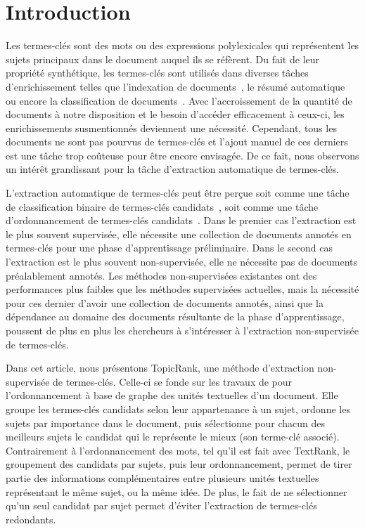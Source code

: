\section{Introduction}
\label{sec:introduction}
  Les termes-clés sont des mots ou des expressions polylexicales qui
  représentent les sujets principaux dans le document auquel ils se réfèrent.
  Du fait de leur propriété synthétique, les termes-clés sont utilisés dans
  diverses tâches d'enrichissement telles que l'indexation de
  documents~\cite{medelyan2008smalltrainingset}, le résumé
  automatique~\cite{litvak2008graphbased} ou encore la classification de
  documents~\cite{han2007webdocumentclustering}. Avec l'accroissement de la
  quantité de documents à notre disposition et le besoin d'accéder efficacement
  à ceux-ci, les enrichissements susmentionnés deviennent une nécessité.
  Cependant, tous les documents ne sont pas pourvus de termes-clés et l'ajout
  manuel de ces derniers est une tâche trop coûteuse pour être encore envisagée.
  De ce fait, nous observons un intérêt grandissant pour la tâche d'extraction
  automatique de termes-clés.

  L'extraction automatique de termes-clés peut être perçue soit comme une tâche
  de classification binaire de termes-clés candidats~\cite{witten1999kea}, soit
  comme une tâche d'ordonnancement de termes-clés
  candidats~\cite{mihalcea2004textrank}. Dans le premier cas l'extraction est le
  plus souvent supervisée, elle nécessite une collection de documents annotés en
  termes-clés pour une phase d'apprentissage préliminaire. Dans le second cas
  l'extraction est le plus souvent non-supervisée, elle ne nécessite pas de
  documents préalablement annotés. Les méthodes non-supervisées existantes ont
  des performances plus faibles que les méthodes supervisées actuelles, mais la
  nécessité pour ces dernier d'avoir une collection de documents annotés, ainsi
  que la dépendance au domaine des documents résultante de la phase
  d'apprentissage, poussent de plus en plus les chercheurs à s'intéresser à
  l'extraction non-supervisée de termes-clés.

  Dans cet article, nous présentons TopicRank, une méthode d'extraction
  non-supervisée de termes-clés. Celle-ci se fonde sur les travaux de
   pour l'ordonnancement à base de
  graphe des unités textuelles d'un document. Elle groupe les termes-clés
  candidats selon leur appartenance à un sujet, ordonne les sujets par
  importance dans le document, puis sélectionne pour chacun des meilleurs sujets
  le candidat qui le représente le mieux (son terme-clé associé).
  Contrairement à l'ordonnancement des mots, tel qu'il est fait avec TextRank,
  le groupement des candidats par sujets, puis leur ordonnancement, permet de
  tirer partie des informations complémentaires entre plusieurs unités
  textuelles représentant le même sujet, ou la même idée. De plus, le fait de ne
  sélectionner qu'un seul candidat par sujet permet d'éviter l'extraction de
  termes-clés redondants.

